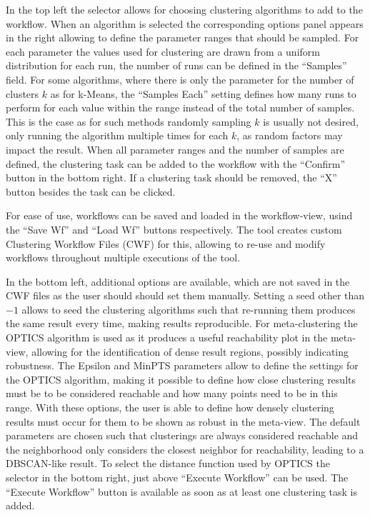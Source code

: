 \documentclass[
	a4paper,
	english,
	twoside,
	openright,               
	11pt                            
	]{report}
\begin{document}
In the top left the selector allows for choosing clustering algorithms to add to the workflow. When an algorithm is selected the corresponding options panel appears in the right allowing to define the parameter ranges that should be sampled. For each parameter the values used for clustering are drawn from a uniform distribution for each run, the number of runs can be defined in the ``Samples'' field. For some algorithms, where there is only the parameter for the number of clusters $k$ as for k-Means, the ``Samples Each'' setting defines how many runs to perform for each value within the range instead of the total number of samples. This is the case as for such methods randomly sampling $k$ is usually not desired, only running the algorithm multiple times for each $k$, as random factors may impact the result. When all parameter ranges and the number of samples are defined, the clustering task can be added to the workflow with the ``Confirm'' button in the bottom right. If a clustering task should be removed, the ``X'' button besides the task can be clicked.

For ease of use, workflows can be saved and loaded in the workflow-view, usind the ``Save Wf'' and ``Load Wf'' buttons respectively. The tool creates custom Clustering Workflow Files (CWF) for this, allowing to re-use and modify workflows throughout multiple executions of the tool.

In the bottom left, additional options are available, which are not saved in the CWF files as the user should should set them manually. Setting a seed other than $-1$ allows to seed the clustering algorithms such that re-running them produces the same result every time, making results reproducible. For meta-clustering the OPTICS \cite{10.1145/304181.304187} algorithm is used as it produces a useful reachability plot in the meta-view, allowing for the identification of dense result regions, possibly indicating robustness. The Epsilon and MinPTS parameters allow to define the settings for the OPTICS algorithm, making it possible to define how close clustering results must be to be considered reachable and how many points need to be in this range. With these options, the user is able to define how densely clustering results must occur for them to be shown as robust in the meta-view. The default parameters are chosen such that clusterings are always considered reachable and the neighborhood only considers the closest neighbor for reachability, leading to a DBSCAN-like result. To select the distance function used by OPTICS the selector in the bottom right, just above ``Execute Workflow'' can be used. The ``Execute Workflow'' button is available as soon as at least one clustering task is added.
\end{document}
